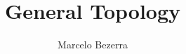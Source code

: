 \documentclass{book}
\title{General Topology}
\author{Marcelo Bezerra}
\begin{document}
\frontmatter

\tableofcontents

\mainmatter



\backmatter

\nocite{*}

\end{document}

